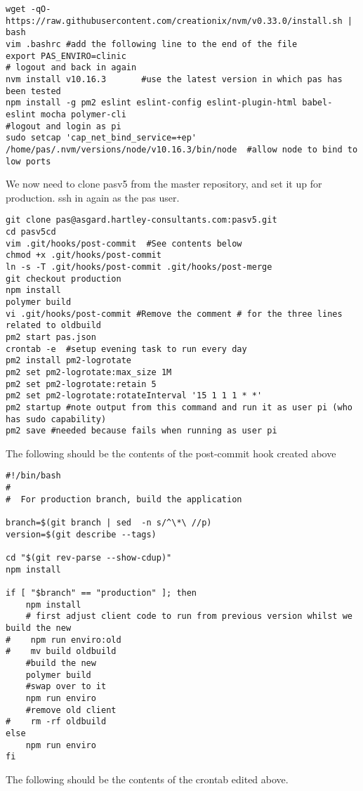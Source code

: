 \documentclass[Draft]{akc}
\begin{document}
\begin{lstlisting}
wget -qO- https://raw.githubusercontent.com/creationix/nvm/v0.33.0/install.sh | bash
vim .bashrc #add the following line to the end of the file
export PAS_ENVIRO=clinic
# logout and back in again
nvm install v10.16.3       #use the latest version in which pas has been tested
npm install -g pm2 eslint eslint-config eslint-plugin-html babel-eslint mocha polymer-cli
#logout and login as pi
sudo setcap 'cap_net_bind_service=+ep' /home/pas/.nvm/versions/node/v10.16.3/bin/node  #allow node to bind to low ports
\end{lstlisting}

We now need to clone pasv5 from the master repository, and set it up for production.  ssh in again as the pas user.

\begin{lstlisting}
git clone pas@asgard.hartley-consultants.com:pasv5.git
cd pasv5cd
vim .git/hooks/post-commit  #See contents below
chmod +x .git/hooks/post-commit
ln -s -T .git/hooks/post-commit .git/hooks/post-merge
git checkout production
npm install
polymer build
vi .git/hooks/post-commit #Remove the comment # for the three lines related to oldbuild
pm2 start pas.json
crontab -e  #setup evening task to run every day
pm2 install pm2-logrotate
pm2 set pm2-logrotate:max_size 1M
pm2 set pm2-logrotate:retain 5
pm2 set pm2-logrotate:rotateInterval '15 1 1 1 * *'
pm2 startup #note output from this command and run it as user pi (who has sudo capability)
pm2 save #needed because fails when running as user pi
\end{lstlisting}

The following should be the contents of the post-commit hook created above

\begin{lstlisting}
#!/bin/bash
#
#  For production branch, build the application

branch=$(git branch | sed  -n s/^\*\ //p)
version=$(git describe --tags)

cd "$(git rev-parse --show-cdup)"
npm install

if [ "$branch" == "production" ]; then
    npm install
    # first adjust client code to run from previous version whilst we build the new
#    npm run enviro:old
#    mv build oldbuild
    #build the new
    polymer build
    #swap over to it
    npm run enviro
    #remove old client
#    rm -rf oldbuild
else
    npm run enviro
fi
\end{lstlisting}

The following should be the contents of the crontab edited above.
\end{document}
